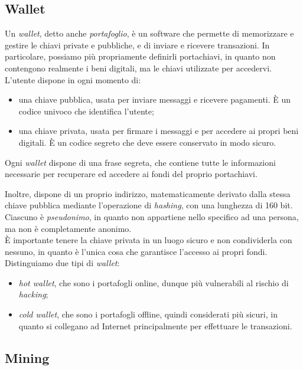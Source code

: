 \subsection{Wallet}\label{sec:tecnologie-blockchain-wallet}

Un \textit{wallet}, detto anche \textit{portafoglio}, è un software che permette di memorizzare e gestire le chiavi private e pubbliche, e di inviare e ricevere transazioni.
In particolare, possiamo più propriamente definirli portachiavi, in quanto non contengono realmente i beni digitali, ma le chiavi utilizzate per accedervi.
L'utente dispone in ogni momento di:
\begin{itemize}
    \item una chiave pubblica, usata per inviare messaggi e ricevere pagamenti. È un codice univoco che identifica l'utente;
    \item una chiave privata, usata per firmare i messaggi e per accedere ai propri beni digitali. È un codice segreto che deve essere conservato in modo sicuro.
\end{itemize} 

Ogni \textit{wallet} dispone di una frase segreta, che contiene tutte le informazioni necessarie per recuperare ed accedere ai fondi del proprio portachiavi.

Inoltre, dispone di un proprio indirizzo, matematicamente derivato dalla stessa chiave pubblica mediante l'operazione di \textit{hashing}, con una lunghezza di 160 bit.
Ciascuno è \textit{pseudonimo}, in quanto non appartiene nello specifico ad una persona, ma non è completamente anonimo. \\
È importante tenere la chiave privata in un luogo sicuro e non condividerla con nessuno, in quanto è l'unica cosa che garantisce l'accesso ai propri fondi.
Distinguiamo due tipi di \textit{wallet}:
\begin{itemize}
    \item \textit{hot wallet}, che sono i portafogli online, dunque più vulnerabili al rischio di \textit{hacking};
    \item \textit{cold wallet}, che sono i portafogli offline, quindi considerati più sicuri, in quanto si collegano ad Internet principalmente per effettuare le transazioni.
\end{itemize}

\subsection{Mining}\label{sec:tecnologie-blockchain-mining}

